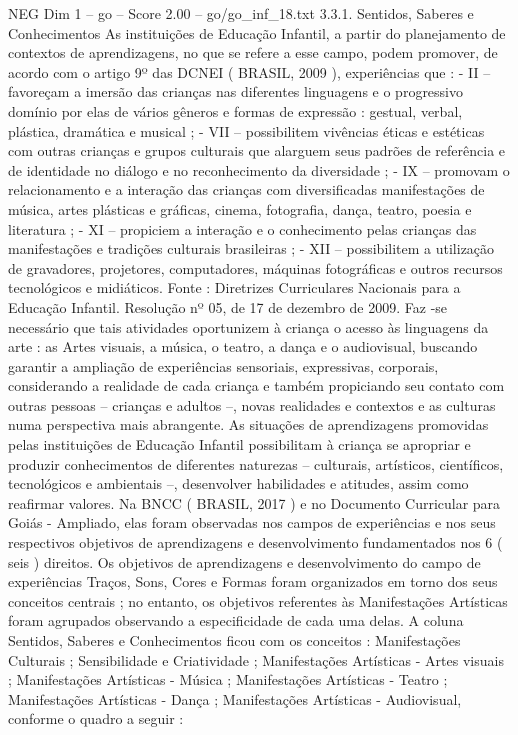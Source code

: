 \begin{textsample}{NEG Dim 1 – go – Score 2.00 – go/go\_inf\_18.txt}  \label{ex:f1_neg_192}
3.3.1.
Sentidos, Saberes e Conhecimentos As instituições de Educação Infantil, a partir do planejamento de contextos de aprendizagens, no que se refere a esse campo, podem promover, de acordo com o artigo 9º das DCNEI ( BRASIL, 2009 ), experiências que : - II – favoreçam a imersão das crianças nas diferentes linguagens e o progressivo domínio por elas de vários gêneros e formas de expressão : gestual, verbal, plástica, dramática e musical ; - VII – possibilitem vivências éticas e estéticas com outras crianças e grupos culturais que alarguem seus padrões de referência e de identidade no diálogo e no reconhecimento da diversidade ; - IX – promovam o relacionamento e a interação das crianças com diversificadas manifestações de música, artes plásticas e gráficas, cinema, fotografia, dança, teatro, poesia e literatura ; - XI – propiciem a interação e o conhecimento pelas crianças das manifestações e tradições culturais brasileiras ; - XII – possibilitem a utilização de gravadores, projetores, computadores, máquinas fotográficas e outros recursos tecnológicos e midiáticos.
Fonte : Diretrizes Curriculares Nacionais para a Educação Infantil.
Resolução nº 05, de 17 de dezembro de 2009.
Faz -se necessário que tais atividades oportunizem à criança o acesso às linguagens da arte : as Artes visuais, a música, o teatro, a dança e o audiovisual, buscando garantir a ampliação de experiências sensoriais, expressivas, corporais, considerando a realidade de cada criança e também propiciando seu contato com outras pessoas – crianças e adultos –, novas realidades e contextos e as culturas numa perspectiva mais abrangente.
As situações de aprendizagens promovidas pelas instituições de Educação Infantil possibilitam à criança se apropriar e produzir conhecimentos de diferentes naturezas – culturais, artísticos, científicos, tecnológicos e ambientais –, desenvolver habilidades e atitudes, assim como reafirmar valores.
Na BNCC ( BRASIL, 2017 ) e no Documento Curricular para Goiás - Ampliado, elas foram observadas nos campos de experiências e nos seus respectivos objetivos de aprendizagens e desenvolvimento fundamentados nos 6 ( seis ) direitos.
Os objetivos de aprendizagens e desenvolvimento do campo de experiências Traços, Sons, Cores e Formas foram organizados em torno dos seus conceitos centrais ; no entanto, os objetivos referentes às Manifestações Artísticas foram agrupados observando a especificidade de cada uma delas.
A coluna Sentidos, Saberes e Conhecimentos ficou com os conceitos : Manifestações Culturais ; Sensibilidade e Criatividade ; Manifestações Artísticas - Artes visuais ; Manifestações Artísticas - Música ; Manifestações Artísticas - Teatro ; Manifestações Artísticas - Dança ; Manifestações Artísticas - Audiovisual, conforme o quadro a seguir :

\end{textsample}
